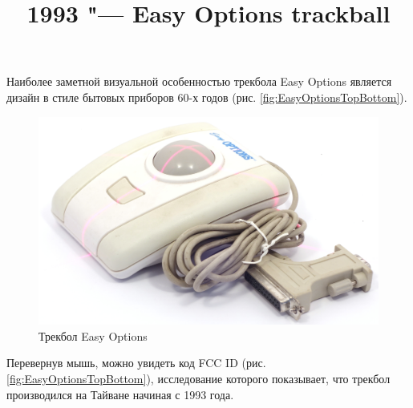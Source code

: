 \documentclass[11pt, a4paper]{article}
\begin{document}
\title{1993 "--- Easy Options trackball}
\date{}
\maketitle

Наиболее заметной визуальной особенностью трекбола Easy Options является дизайн в стиле бытовых приборов 60-х годов (рис. \ref{fig:EasyOptionsTopBottom}).

\begin{figure}[h]
    \centering
    \includegraphics[scale=0.5]{1993_easy_options_trackball/pic_60.jpg}
    \caption{Трекбол Easy Options}
    \label{fig:EasyOptionsSize}
\end{figure}

Перевернув мышь, можно увидеть код FCC ID (рис. \ref{fig:EasyOptionsTopBottom}), исследование которого показывает, что трекбол производился на Тайване начиная с 1993 года.
\end{document}
